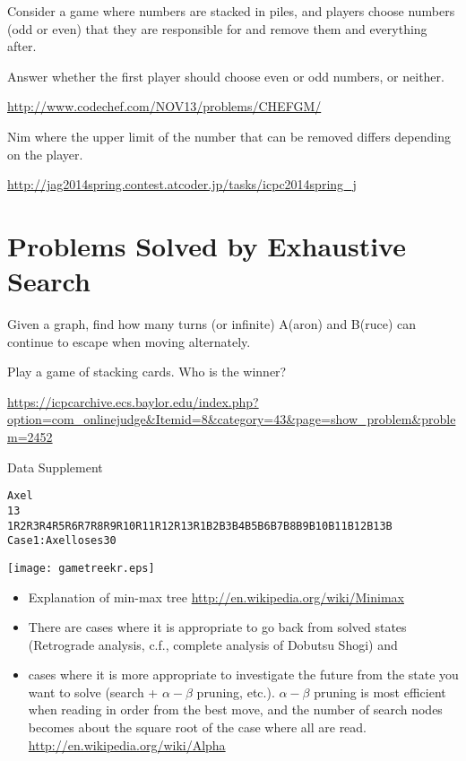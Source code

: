 \begin{pbox}
Consider a game where numbers are stacked in piles, and players choose numbers (odd or even) that they are responsible for and remove them and everything after.

Answer whether the first player should choose even or odd numbers, or neither.

\url{http://www.codechef.com/NOV13/problems/CHEFGM/}
\end{pbox}

\begin{pbox}
Nim where the upper limit of the number that can be removed differs depending on the player.

\url{http://jag2014spring.contest.atcoder.jp/tasks/icpc2014spring_j}
\end{pbox}

\section{Problems Solved by Exhaustive Search}

\begin{psbox}
  Given a graph, find how many turns (or infinite) A(aron) and B(ruce) can continue to escape when moving alternately.

\end{psbox}

\begin{pbox}
Play a game of stacking cards. Who is the winner?

\url{https://icpcarchive.ecs.baylor.edu/index.php?option=com_onlinejudge&Itemid=8&category=43&page=show_problem&problem=2452}  
\end{pbox}

Data Supplement
\begin{alltt}
Axel
13
1R 2R 3R 4R 5R 6R 7R 8R 9R 10R 11R 12R 13R 1B 2B 3B 4B 5B 6B 7B 8B 9B 10B 11B 12B 13B
Case 1: Axel loses 30
\end{alltt}

\centerline{\texttt{[image: gametreekr.eps]}}


\begin{itemize}
\item Explanation of min-max tree \url{http://en.wikipedia.org/wiki/Minimax}
\item There are cases where it is appropriate to go back from solved states (Retrograde analysis, c.f., complete analysis of Dobutsu Shogi) and
\item cases where it is more appropriate to investigate the future from the state you want to solve (search + $\alpha-\beta$ pruning, etc.). $\alpha-\beta$ pruning is most efficient when reading in order from the best move, and the number of search nodes becomes about the square root of the case where all are read. \url{http://en.wikipedia.org/wiki/Alpha}
\end{itemize}

